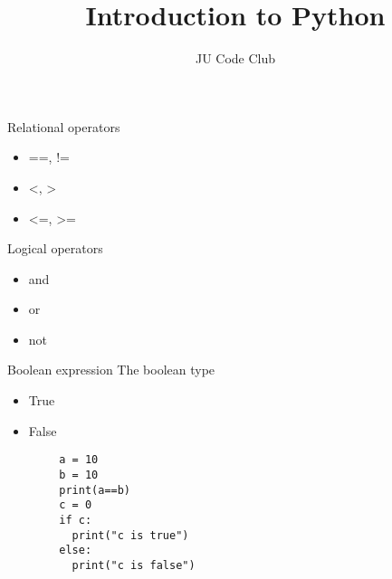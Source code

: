 \documentclass{beamer}
\title{Introduction to Python}
\author{JU Code Club}
\date{}
\begin{document}
\maketitle

\begin{frame}[fragile]{Relational operators}
	\begin{itemize}
		\item ==, !=
		\item \textless, \textgreater
		\item \textless=, \textgreater=
	\end{itemize}
\end{frame}

\begin{frame}[fragile]{Logical operators}
	\begin{itemize}
		\item and
		\item or
		\item not
	\end{itemize}
\end{frame}

\begin{frame}[fragile]{Boolean expression}
	\Large{The boolean type}
	\begin{itemize}
		\item True
		\item False
	\end{itemize}

	\begin{verbatim}
		a = 10
		b = 10
		print(a==b)
		c = 0
		if c:
		  print("c is true")
		else:
		  print("c is false")
	\end{verbatim}
\end{frame}
\end{document}
